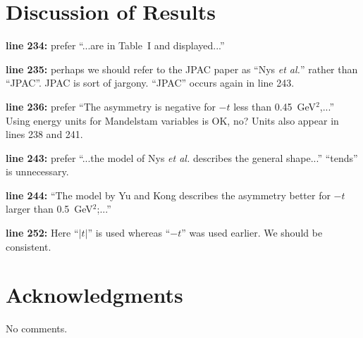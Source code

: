 \documentclass{article}
\newcommand{\itm}[1]{\item{\bf line #1:}}
\begin{document}
\section{Discussion of Results}
\begin{description}
\itm{234} prefer ``...are in Table~I and displayed...''
\itm{235} perhaps we should refer to the JPAC paper as ``Nys {\it et al.}'' rather than ``JPAC''. JPAC is sort of jargony. ``JPAC'' occurs again in line 243.
\itm{236} prefer ``The asymmetry is negative for $-t$ less than 0.45~GeV$^2$,...'' Using energy units for Mandelstam variables is OK, no? Units also appear in lines 238 and 241.
\itm{243} prefer ``...the model of Nys {\it et al.} describes the general shape...'' ``tends'' is unnecessary.
\itm{244} ``The model by Yu and Kong describes the asymmetry better for $-t$ larger than 0.5~GeV$^2$;...'' 
\itm{252} Here ``$|t|$'' is used whereas ``$-t$'' was used earlier. We should be consistent.
\end{description}

\section{Acknowledgments}

No comments.
\end{document}
